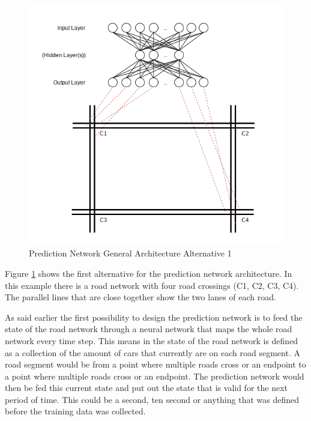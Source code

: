 \begin{figure}[!ht]
  \centering
  \includegraphics[width=16cm]{figures/predictionNetworkAlt1}
  \caption[Prediction Network General Architecture Alternative 1]{Prediction Network General Architecture Alternative 1 \protect\footnotemark}
  \label{predictionNetworkAlt1}
\end{figure}


Figure \ref{predictionNetworkAlt1} shows the first alternative for the prediction network architecture. In this example there is a road network with four road crossings (C1, C2, C3, C4). The parallel lines that are close together show the two lanes of each road. 

As said earlier the first possibility to design the prediction network is to feed the state of the road network through a neural network that maps the whole road network every time step. This means in the state of the road network is defined as a collection of the amount of cars that currently are on each road segment. A road segment would be from a point where multiple roads cross or an endpoint to a point where multiple roads cross or an endpoint. The prediction network would then be fed this current state and put out the state that is valid for the next period of time. This could be a second, ten second or anything that was defined before the training data was collected.

